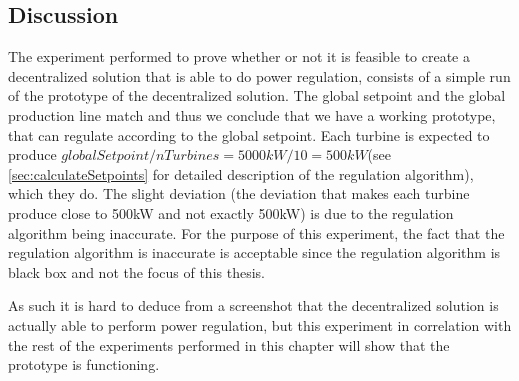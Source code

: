 \subsection{Discussion}
The experiment performed to prove whether or not it is feasible to create a decentralized solution that is able to do power regulation, consists of a simple run of the prototype of the decentralized solution. The global setpoint and the global production line match and thus we conclude that we have a working prototype, that can regulate according to the global setpoint. Each turbine is expected to produce $globalSetpoint/nTurbines=5000kW/10=500kW$(see \cref{sec:calculateSetpoints} for detailed description of the regulation algorithm), which they do. The slight deviation (the deviation that makes each turbine produce close to 500kW and not exactly 500kW) is due to the regulation algorithm being inaccurate. For the purpose of this experiment, the fact that the regulation algorithm is inaccurate is acceptable since the regulation algorithm is black box and not the focus of this thesis.

As such it is hard to deduce from a screenshot that the decentralized solution is actually able to perform power regulation, but this experiment in correlation with the rest of the experiments performed in this chapter will show that the prototype is functioning.

\clearpage